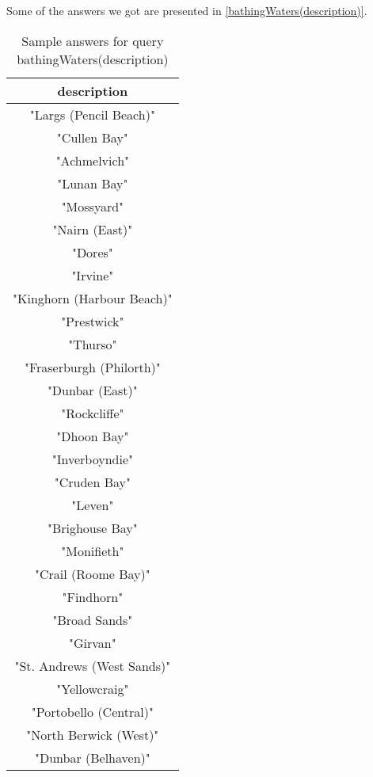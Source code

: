 \documentclass[a4paper,10pt]{article}
\begin{document}
Some of the answers we got are presented in  \ref{bathingWaters(description)}.  
\begin{table}[!tb]
\caption{Sample answers for query bathingWaters(description) }
\begin{center}

\begin{tabular}{c}
\hline
description \\ \hline
"Largs (Pencil Beach)"     \\     
 "Cullen Bay"                \\    
 "Achmelvich"                  \\  
 "Lunan Bay"                     \\
 "Mossyard"                      \\
 "Nairn (East)"                  \\
 "Dores"                         \\
 "Irvine"                        \\
 "Kinghorn (Harbour Beach)"      \\
 "Prestwick"                     \\
 "Thurso"                        \\
 "Fraserburgh (Philorth)"        \\
 "Dunbar (East)"                 \\
 "Rockcliffe"                    \\
 "Dhoon Bay"                     \\
 "Inverboyndie"                  \\
 "Cruden Bay"                    \\
 "Leven"                         \\
 "Brighouse Bay"                 \\
 "Monifieth"                     \\
 "Crail (Roome Bay)"             \\
 "Findhorn"                      \\
 "Broad Sands"                   \\
 "Girvan"                        \\
 "St. Andrews (West Sands)"      \\
 "Yellowcraig"                   \\
 "Portobello (Central)"          \\
 "North Berwick (West)"          \\
 "Dunbar (Belhaven)"             \\

\end{tabular}
\end{center}
\end{table}
\end{document}
